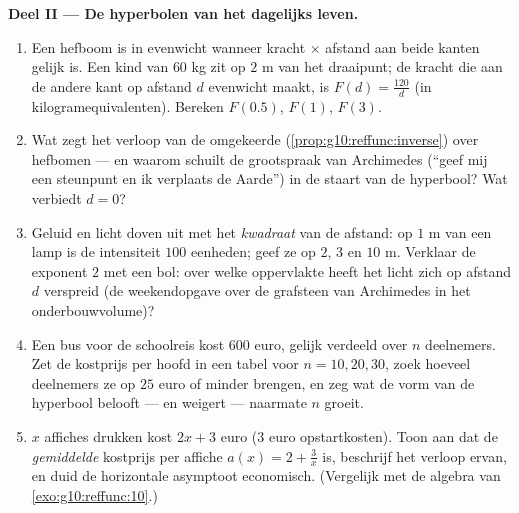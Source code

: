 \begin{problem}
\medskip
\noindent\textbf{Deel II --- De hyperbolen van het dagelijks leven.}
\begin{enumerate}[resume]
  \item Een hefboom is in evenwicht wanneer kracht $\times$ afstand aan beide
        kanten gelijk is. Een kind van $60$ kg zit op $2$ m van het
        draaipunt; de kracht die aan de andere kant op afstand $d$ evenwicht
        maakt, is $F(d) = \frac{120}{d}$ (in kilogramequivalenten). Bereken
        $F(0.5)$, $F(1)$, $F(3)$.
  \item Wat zegt het verloop van de omgekeerde 
        (\cref{prop:g10:reffunc:inverse}) over hefbomen --- en waarom schuilt
        de grootspraak van Archimedes (``geef mij een steunpunt en ik verplaats
        de Aarde'') in de staart van de hyperbool? Wat verbiedt $d = 0$?
  \item Geluid en licht doven uit met het \emph{kwadraat} van de afstand: op
        $1$ m van een lamp is de intensiteit $100$ eenheden; geef ze op $2$,
        $3$ en $10$ m. Verklaar de exponent $2$ met een bol: over welke
        oppervlakte heeft het licht zich op afstand $d$ verspreid (de
        weekendopgave over de grafsteen van Archimedes in het
        onderbouwvolume)?
  \item Een bus voor de schoolreis kost $600$ euro, gelijk verdeeld over $n$
        deelnemers. Zet de kostprijs per hoofd in een tabel voor
        $n = 10, 20, 30$, zoek hoeveel deelnemers ze op $25$ euro of minder
        brengen, en zeg wat de vorm van de hyperbool belooft --- en weigert
        --- naarmate $n$ groeit.
  \item $x$ affiches drukken kost $2x + 3$ euro ($3$ euro opstartkosten).
        Toon aan dat de \emph{gemiddelde} kostprijs per affiche
        $a(x) = 2 + \frac3x$ is, beschrijf het verloop ervan, en duid de
        horizontale asymptoot economisch. (Vergelijk met de algebra van
        \cref{exo:g10:reffunc:10}.)
\end{enumerate}


\end{problem}

